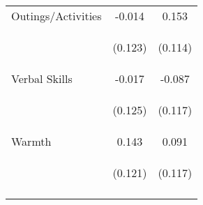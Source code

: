 \begin{tabular}{lcc}
\noalign{\smallskip}Outings/Activities & -0.014 & 0.153\\
 & \begin{footnotesize}(0.123)\end{footnotesize} & \begin{footnotesize}(0.114)\end{footnotesize}\\
\noalign{\smallskip}Verbal Skills & -0.017 & -0.087\\
 & \begin{footnotesize}(0.125)\end{footnotesize} & \begin{footnotesize}(0.117)\end{footnotesize}\\
\noalign{\smallskip}Warmth & 0.143 & 0.091\\
 & \begin{footnotesize}(0.121)\end{footnotesize} & \begin{footnotesize}(0.117)\end{footnotesize}\\
\noalign{\smallskip}\hline\end{tabular}\\
